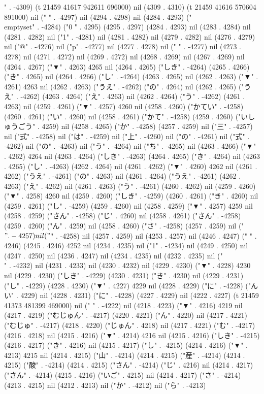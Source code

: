 {" . -4309) (t 21459 41617 942611 696000) nil (4309 . 4310) (t 21459 41616 570604 891000) nil (" " . -4297) nil (4294 . 4298) nil (4284 . 4293) ("\\emptyset" . -4284) ("0
" . 4295) (4295 . 4297) (4284 . 4293) nil (4283 . 4284) nil (4281 . 4282) nil ("1" . -4281) nil (4281 . 4282) nil (4279 . 4282) nil (4276 . 4279) nil ("@" . -4276) nil ("p" . -4277) nil (4277 . 4278) nil (" " . -4277) nil (4273 . 4278) nil (4271 . 4272) nil (4269 . 4272) nil (4268 . 4269) nil (4267 . 4269) nil (4264 . 4267) ("▼" . 4263) 4265 nil (4264 . 4265) ("しき" . -4264) (4265 . 4266) ("き" . 4265) nil (4264 . 4266) ("し" . -4264) (4263 . 4265) nil (4262 . 4263) ("▼" . 4261) 4263 nil (4262 . 4263) ("うえ" . -4262) ("の" . 4264) nil (4262 . 4265) ("うえ" . -4262) (4263 . 4264) ("え" . 4263) nil (4262 . 4264) ("う" . -4262) (4261 . 4263) nil (4259 . 4261) ("▼" . 4257) 4260 nil (4258 . 4260) ("かてい" . -4258) (4260 . 4261) ("い" . 4260) nil (4258 . 4261) ("かて" . -4258) (4259 . 4260) ("いしゅうごう" . 4259) nil (4258 . 4265) ("か" . -4258) (4257 . 4259) nil ("三" . -4257) nil ("式" . -4258) nil ("は" . -4259) nil ("上" . -4260) nil ("の" . -4261) nil ("式" . -4262) nil ("の" . -4263) nil ("う" . -4264) nil ("ち" . -4265) nil (4263 . 4266) ("▼" . 4262) 4264 nil (4263 . 4264) ("しき" . -4263) (4264 . 4265) ("き" . 4264) nil (4263 . 4265) ("し" . -4263) (4262 . 4264) nil (4261 . 4262) ("▼" . 4260) 4262 nil (4261 . 4262) ("うえ" . -4261) ("の" . 4263) nil (4261 . 4264) ("うえ" . -4261) (4262 . 4263) ("え" . 4262) nil (4261 . 4263) ("う" . -4261) (4260 . 4262) nil (4259 . 4260) ("▼" . 4258) 4260 nil (4259 . 4260) ("しき" . -4259) (4260 . 4261) ("き" . 4260) nil (4259 . 4261) ("し" . -4259) (4259 . 4260) nil (4258 . 4259) ("▼" . 4257) 4259 nil (4258 . 4259) ("さん" . -4258) ("じ" . 4260) nil (4258 . 4261) ("さん" . -4258) (4259 . 4260) ("ん" . 4259) nil (4258 . 4260) ("さ" . -4258) (4257 . 4259) nil ("$" . -4257) nil ("$" . -4258) nil (4257 . 4259) nil (4253 . 4257) nil (4246 . 4247) (" " . 4246) (4245 . 4246) 4252 nil (4234 . 4235) nil ("1" . -4234) nil (4249 . 4250) nil (4247 . 4250) nil (4236 . 4247) nil (4234 . 4235) nil (4232 . 4235) nil ("\\" . -4232) nil (4231 . 4233) nil (4230 . 4232) nil (4229 . 4230) ("▼" . 4228) 4230 nil (4229 . 4230) ("しき" . -4229) (4230 . 4231) ("き" . 4230) nil (4229 . 4231) ("し" . -4229) (4228 . 4230) ("▼" . 4227) 4229 nil (4228 . 4229) ("に" . -4228) ("んい" . 4229) nil (4228 . 4231) ("に" . -4228) (4227 . 4229) nil (4222 . 4227) (t 21459 41373 481399 469000) nil (" " . -4222) nil (4218 . 4223) ("▼" . 4216) 4219 nil (4217 . 4219) ("むじゅん" . -4217) (4220 . 4221) ("ん" . 4220) nil (4217 . 4221) ("むじゅ" . -4217) (4218 . 4220) ("じゅん" . 4218) nil (4217 . 4221) ("む" . -4217) (4216 . 4218) nil (4215 . 4216) ("▼" . 4214) 4216 nil (4215 . 4216) ("しき" . -4215) (4216 . 4217) ("き" . 4216) nil (4215 . 4217) ("し" . -4215) (4214 . 4216) ("▼" . 4213) 4215 nil (4214 . 4215) ("山" . -4214) (4214 . 4215) ("産" . -4214) (4214 . 4215) ("酸" . -4214) (4214 . 4215) ("さん" . -4214) ("じ" . 4216) nil (4214 . 4217) ("さん" . -4214) (4215 . 4216) ("いご" . 4215) nil (4214 . 4217) ("さ" . -4214) (4213 . 4215) nil (4212 . 4213) nil ("か" . -4212) nil ("ら" . -4213) }
